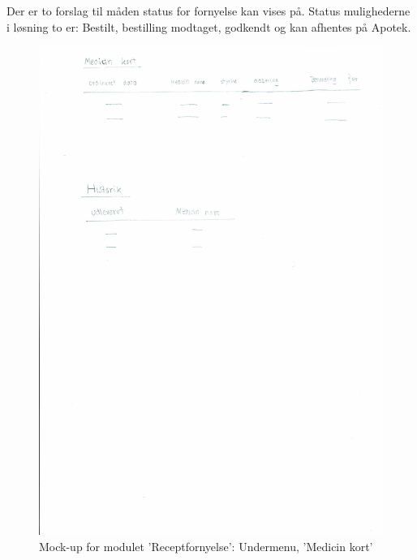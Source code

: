 Der er to forslag til måden status for fornyelse kan vises på. Status mulighederne i løsning to er: Bestilt, bestilling modtaget, godkendt og kan afhentes på Apotek.\\
\begin{figure}[H]
	\centering
	\includegraphics[angle=0, height=0.2\textheight]{Materials/FornyRecept_Medicinkort.pdf}
	\caption{Mock-up for modulet 'Receptfornyelse': Undermenu, 'Medicin kort'}
	\label{fig:Mock-Up}
\end{figure}
